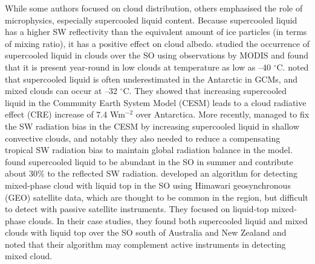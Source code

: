 While some authors focused on cloud distribution, others
emphasised the role of microphysics, especially supercooled liquid content.
Because supercooled liquid has a higher SW reflectivity than the equivalent amount
of ice particles (in terms of mixing ratio), it has a positive effect on cloud albedo.
\cite{morrison2011} studied the occurrence of supercooled liquid in clouds
over the SO using observations by MODIS and
found that it is present year-round in low clouds at temperature as low as
--40 $^{\circ}$C.
\cite{lawson2014} noted that supercooled liquid is often
underestimated in the Antarctic in GCMs, and mixed clouds can occur at
--32 $^{\circ}$C.
They showed that increasing supercooled liquid in the
Community Earth System Model (CESM) leads to a cloud radiative effect (CRE)
increase of 7.4 Wm$^{-2}$ over Antarctica. More recently, \cite{kay2016}
managed to fix the SW radiation bias in the CESM by increasing supercooled liquid
in shallow convective clouds, and notably they also needed to reduce a
compensating tropical SW radiation bias to maintain global radiation balance
in the model.
\cite{bodas-salcedo2016} found supercooled liquid to be abundant in
the SO in summer and contribute about 30\% to the reflected
SW radiation.
\cite{noh2019} developed an algorithm for detecting mixed-phase cloud with
liquid top in the SO using Himawari geosynchronous (GEO) satellite data, which are thought
to be common in the region, but difficult to detect with passive satellite
instruments. They focused on liquid‐top mixed‐phase clouds. In their case studies, they found both supercooled liquid
and mixed clouds with liquid top over the SO south of Australia and
New Zealand and noted that their algorithm may complement active instruments
in detecting mixed cloud.


